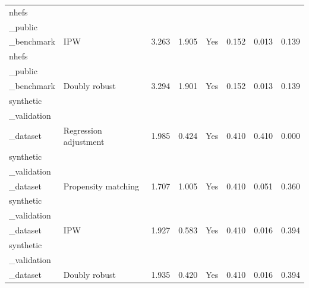 \begin{table}[t!]
\begin{tabular}{llllllll}
nhefs\\_public\\_benchmark & IPW & 3.263 & 1.905 & Yes & 0.152 & 0.013 & 0.139 \\
nhefs\\_public\\_benchmark & Doubly robust & 3.294 & 1.901 & Yes & 0.152 & 0.013 & 0.139 \\
synthetic\\_validation\\_dataset & Regression adjustment & 1.985 & 0.424 & Yes & 0.410 & 0.410 & 0.000 \\
synthetic\\_validation\\_dataset & Propensity matching & 1.707 & 1.005 & Yes & 0.410 & 0.051 & 0.360 \\
synthetic\\_validation\\_dataset & IPW & 1.927 & 0.583 & Yes & 0.410 & 0.016 & 0.394 \\
synthetic\\_validation\\_dataset & Doubly robust & 1.935 & 0.420 & Yes & 0.410 & 0.016 & 0.394 \\
\hline
\end{tabular}
\end{table}
